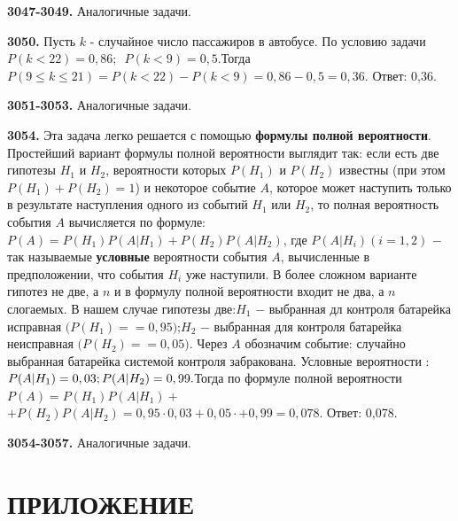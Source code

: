 \textbf{3047-3049.} Аналогичные задачи.

\textbf{3050.} Пусть $k$ - случайное число пассажиров в автобусе. По условию задачи $P(k<22)=0,86;\enspace P(k<9)=0,5.$\newline Тогда $P(9\leq k\leq21)=P(k<22)-P(k<9)=0,86-0,5=0,36.$ \newline \null \hspace*{\fill} Ответ: 0,36. 

\textbf{3051-3053.} Аналогичные задачи.

\textbf{3054.} Эта задача легко решается с помощью \textbf{формулы полной вероятности}. Простейший вариант формулы полной вероятности выглядит так: если есть две гипотезы $H_1$ и $H_2$, вероятности которых $P(H_1)$ и $P(H_2)$ известны (при этом $P(H_1) + P(H_2)=1$) и некоторое событие $A$, которое может наступить только в результате наступления одного из событий $H_1$ или $H_2$, то полная вероятность события $A$ вычисляется по формуле: \newline$P(A)=P(H_1)P(A|H_1)+P(H_2)P(A|H_2)$, где $P(A|H_i)(i=1,2)$ $-$ так называемые \textbf{условные} вероятности события $A$, вычисленные в предположении, что события $H_i$ уже наступили. В более сложном варианте гипотез не две, а $n$ и в формулу полной вероятности входит не два, а $n$ слогаемых. В нашем случае гипотезы две:\newline $H_1$ $-$ выбранная дл контроля батарейка исправная $(P(H_1)=$\newline$=0,95)$;\newline$H_2$ $-$ выбранная для контроля батарейка неисправная $(P(H_2)=$\newline$=0,05).$
Через $A$ обозначим событие: случайно выбранная батарейка системой контроля забракована. Условные вероятности : $P(A|H_1)=0,03;\newline P(A|H_2)=0,99.$\newline Тогда по формуле полной вероятности $P(A)=P(H_1)P(A|H_1)+$\newline$+P(H_2)P(A|H_2)=0,95\cdot0,03+0,05\cdot+0,99=0,078.$ \newline \null \hspace*{\fill} Ответ: 0,078. 


\textbf{3054-3057.} Аналогичные задачи.

\chapter*{ПРИЛОЖЕНИЕ}
